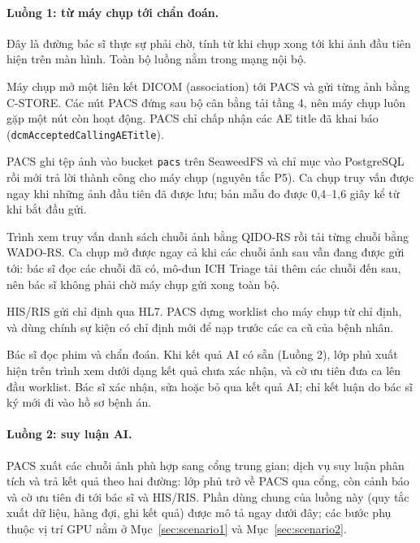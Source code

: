 \paragraph{Luồng 1: từ máy chụp tới chẩn đoán.} Đây là đường bác sĩ thực sự phải chờ,
tính từ khi chụp xong tới khi ảnh đầu tiên hiện trên màn hình. Toàn bộ luồng nằm trong
mạng nội bộ.
\begin{description}[leftmargin=1.2cm,style=nextline]
\item[1.1] Máy chụp mở một liên kết DICOM (association) tới PACS và gửi từng ảnh bằng
      C-STORE. Các nút PACS đứng sau bộ cân bằng tải tầng 4, nên máy chụp luôn gặp một
      nút còn hoạt động. PACS chỉ chấp nhận các AE title đã khai báo
      (\texttt{dcmAcceptedCallingAETitle}).
\item[1.2] PACS ghi tệp ảnh vào bucket \texttt{pacs} trên SeaweedFS và chỉ mục vào
      PostgreSQL rồi mới trả lời thành công cho máy chụp (nguyên tắc P5). Ca chụp truy
      vấn được ngay khi những ảnh đầu tiên đã được lưu; bản mẫu đo được 0{,}4--1{,}6 giây
      kể từ khi bắt đầu gửi.
\item[1.3] Trình xem truy vấn danh sách chuỗi ảnh bằng QIDO-RS rồi tải từng chuỗi bằng
      WADO-RS. Ca chụp mở được ngay cả khi các chuỗi ảnh sau vẫn đang được gửi tới: bác
      sĩ đọc các chuỗi đã có, mô-đun ICH Triage tải thêm các chuỗi đến sau, nên bác sĩ
      không phải chờ máy chụp gửi xong toàn bộ.
\item[1.4] HIS/RIS gửi chỉ định qua HL7. PACS dựng worklist cho máy chụp từ chỉ định,
      và dùng chính sự kiện có chỉ định mới để nạp trước các ca cũ của bệnh nhân.
\item[1.5] Bác sĩ đọc phim và chẩn đoán. Khi kết quả AI có sẵn (Luồng 2), lớp phủ xuất
      hiện trên trình xem dưới dạng kết quả chưa xác nhận, và cờ ưu tiên đưa ca lên đầu
      worklist. Bác sĩ xác nhận, sửa hoặc bỏ qua kết quả AI; chỉ kết luận do bác sĩ ký mới
      đi vào hồ sơ bệnh án.
\end{description}

\paragraph{Luồng 2: suy luận AI.} PACS xuất các chuỗi ảnh phù hợp sang cổng trung
gian; dịch vụ suy luận phân tích và trả kết quả theo hai đường: lớp phủ trở về PACS qua
cổng, còn cảnh báo và cờ ưu tiên đi tới bác sĩ và HIS/RIS. Phần dùng chung của luồng
này (quy tắc xuất dữ liệu, hàng đợi, ghi kết quả) được mô tả ngay dưới đây; các bước
phụ thuộc vị trí GPU nằm ở Mục~\ref{sec:scenario1} và Mục~\ref{sec:scenario2}.

